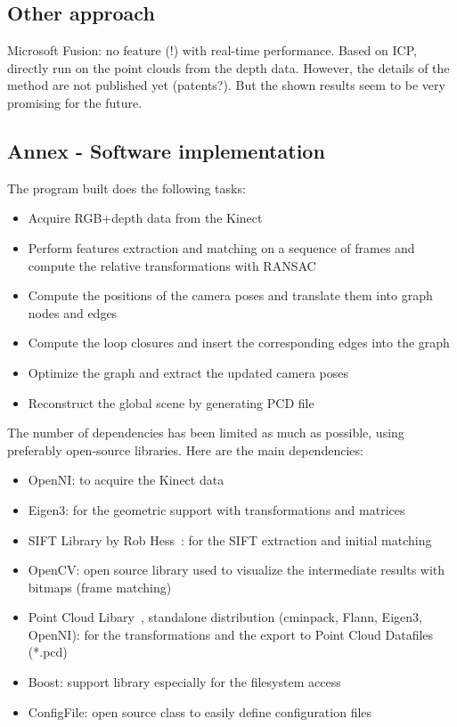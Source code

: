 \section{Other approach}

Microsoft Fusion: no feature (!) with real-time performance. Based on ICP, directly run on the point clouds from the depth data. However, the details of the method are not published yet (patents?). But the shown results seem to be very promising for the future.

\begin{appendices}
\chapter{Annex - Software implementation}

The program built does the following tasks:
\begin{itemize}
\item Acquire RGB+depth data from the Kinect
\item Perform features extraction and matching on a sequence of frames and compute the relative transformations with RANSAC
\item Compute the positions of the camera poses and translate them into graph nodes and edges
\item Compute the loop closures and insert the corresponding edges into the graph
\item Optimize the graph and extract the updated camera poses
\item Reconstruct the global scene by generating PCD file
\end{itemize}

The number of dependencies has been limited as much as possible, using preferably open-source libraries.
Here are the main dependencies:
\begin{itemize}
\item OpenNI: to acquire the Kinect data
\item Eigen3: for the geometric support with transformations and matrices
\item SIFT Library by Rob Hess~\cite{hess_sift}: for the SIFT extraction and initial matching
\item OpenCV: open source library used to visualize the intermediate results with bitmaps (frame matching)
\item Point Cloud Libary~\cite{Rusu_ICRA2011_PCL}, standalone distribution (cminpack, Flann, Eigen3, OpenNI): for the transformations and the export to Point Cloud Datafiles (*.pcd)
\item Boost: support library especially for the filesystem access
\item ConfigFile: open source class to easily define configuration files
\end{itemize}

\end{appendices}

